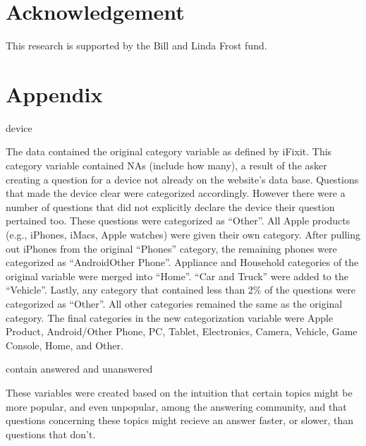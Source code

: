 \documentclass[12pt]{article}
\begin{document}
\section{Acknowledgement}

This research is supported by the Bill and Linda Frost fund. 


\section{Appendix} 

device

The data contained the original category variable as defined by iFixit. This category variable contained NAs (include how many), a result of the asker creating a question for a device not already on the website's data base. Questions that made the device clear were categorized accordingly. However there were a number of questions that did not explicitly declare the device their question pertained too. These questions were categorized as ``Other''. All Apple products (e.g., iPhones, iMacs, Apple watches) were given their own category. After pulling out iPhones from the original ``Phones'' category, the remaining phones were categorized as ``AndroidOther Phone''. Appliance and Household categories of the original variable were merged into ``Home''. ``Car and Truck'' were added to the ``Vehicle''. Lastly, any category that contained less than 2\% of the questions were categorized as ``Other''. All other categories remained the same as the original category. The final categories in the new categorization variable were Apple Product, Android/Other Phone, PC, Tablet, Electronics, Camera, Vehicle, Game Console, Home, and Other. 

contain answered and unanswered

  These variables were created based on the intuition that certain topics might be more popular, and even unpopular, among the answering community, and that questions concerning these topics might recieve an answer faster, or slower, than questions that don't. 
  
\end{document}
